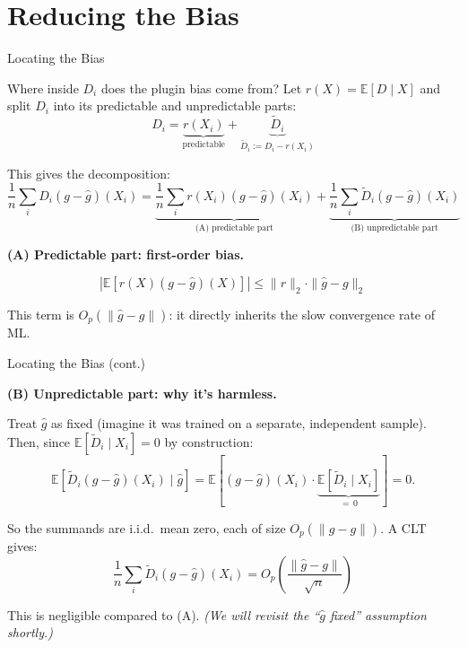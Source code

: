 \documentclass[aspectratio=169, 11pt, handout]{beamer}
\begin{document}
\section{Reducing the Bias}

\begin{frame}{Locating the Bias}

Where inside $D_i$ does the plugin bias come from? Let $r(X) = \mathbb{E}[D \mid X]$ and split $D_i$ into its predictable and unpredictable parts:
\[
D_i = \underbrace{r(X_i)}_{\text{predictable}} + \underbrace{\tilde{D}_i}_{\tilde{D}_i := D_i - r(X_i)}
\]

This gives the decomposition:
\[
\frac{1}{n}\sum_i D_i(g - \hat{g})(X_i)
=
\underbrace{\frac{1}{n}\sum_i r(X_i)(g - \hat{g})(X_i)}_{\text{(A) predictable part}}
+
\underbrace{\frac{1}{n}\sum_i \tilde{D}_i(g - \hat{g})(X_i)}_{\text{(B) unpredictable part}}
\]

\pause
\bigskip

\textbf{(A) Predictable part: first-order bias.}

\[
\left| \mathbb{E}[r(X)(g - \hat{g})(X)] \right|
\le \|r\|_2 \cdot \|\hat{g} - g\|_2
\]

This term is $O_p(\|\hat{g} - g\|)$: it directly inherits the slow convergence rate of ML.

\end{frame}




\begin{frame}{Locating the Bias (cont.)}

\textbf{(B) Unpredictable part: why it's harmless.}

Treat $\hat{g}$ as fixed (imagine it was trained on a separate, independent sample). Then, since $\mathbb{E}[\tilde{D}_i \mid X_i] = 0$ by construction:
\[
\mathbb{E}\!\left[\tilde{D}_i (g - \hat{g})(X_i) \;\big|\; \hat{g}\right]
= \mathbb{E}\!\left[(g - \hat{g})(X_i) \cdot \underbrace{\mathbb{E}[\tilde{D}_i \mid X_i]}_{=\,0}\right] = 0.
\]

\pause

So the summands are i.i.d.\ mean zero, each of size $O_p(\|\hat{g} - g\|)$. A CLT gives:
\[
\frac{1}{n}\sum_i \tilde{D}_i(g - \hat{g})(X_i) = O_p\!\left(\frac{\|\hat{g} - g\|}{\sqrt{n}}\right)
\]

This is negligible compared to (A). \emph{(We will revisit the ``$\hat{g}$ fixed'' assumption shortly.)}

\end{frame}
\end{document}
